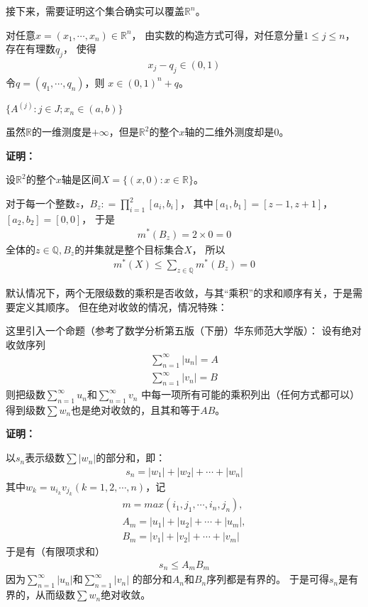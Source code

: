 \documentclass{article}
\begin{document}
接下来，需要证明这个集合确实可以覆盖$\mathbb{R}^n$。

对任意$x = (x_1, \cdots, x_n) \in \mathbb{R}^n$，
由实数的构造方式可得，对任意分量$1 \leq j \leq n$，
存在有理数$q_j$，
使得
\begin{align*}
  x_j - q_j \in (0, 1)
\end{align*}
令$q = (q_1, \cdots, q_n)$，则
$x \in (0, 1)^n + q$。

$\{A^{(j)}: j \in J; x_n \in (a, b)\}$

\begin{zremark}
  虽然$\mathbb{R}$的一维测度是$+\infty$，但是$\mathbb{R}^2$的整个$x$轴的二维外测度却是$0$。
\end{zremark}

\textbf{证明：}

设$\mathbb{R}^2$的整个$x$轴是区间$X = \{(x, 0): x \in \mathbb{R}\}$。

对于每一个整数$z$，$B_z : = \prod \limits_{i = 1}^2 [a_i, b_i]$，
其中$[a_1, b_1]= [z - 1, z + 1]$，$[a_2, b_2] = [0, 0]$，
于是
\begin{align*}
  m^{\ast}(B_z) = 2 \times 0 = 0
\end{align*}
全体的$z \in \mathbb{Q}, B_z$的并集就是整个目标集合$X$，
所以
\begin{align*}
  m^{\ast}(X) \leq \sum \limits_{z \in \mathbb{Q}} m^{\ast}(B_z) = 0
\end{align*}

\begin{zremark}
  默认情况下，两个无限级数的乘积是否收敛，与其“乘积”的求和顺序有关，于是需要定义其顺序。
  但在绝对收敛的情况，情况特殊：

  这里引入一个命题（参考了数学分析第五版（下册）华东师范大学版）：
  设有绝对收敛序列
  \begin{align*}
    \sum \limits_{n = 1}^{\infty} |u_n| = A \\
    \sum \limits_{n = 1}^{\infty} |v_n| = B
  \end{align*}
  则把级数$\sum \limits_{n = 1}^{\infty} u_n$和$\sum \limits_{n = 1}^{\infty} v_n$
  中每一项所有可能的乘积列出（任何方式都可以）得到级数$\sum w_n$也是绝对收敛的，且其和等于$AB$。
\end{zremark}

\textbf{证明：}

以$s_n$表示级数$\sum |w_n|$的部分和，即：
\begin{align*}
  s_n = |w_1| + |w_2| + \cdots + |w_n|
\end{align*}
其中$w_k = u_{i_k}v_{j_k}(k = 1, 2, \cdots, n)$，记
\begin{align*}
  m = max(i_1, j_1, \cdots, i_n, j_n),  \\
  A_m = |u_1| + |u_2| + \cdots + |u_m|, \\
  B_m = |v_1| + |v_2| + \cdots + |v_m|
\end{align*}
于是有（有限项求和）
\begin{align*}
  s_n \leq A_m B_m
\end{align*}
因为$\sum \limits_{n = 1}^{\infty} |u_n|$和$\sum \limits_{n = 1}^{\infty} |v_n|$
的部分和${A_n}$和${B_n}$序列都是有界的。
于是可得${s_n}$是有界的，从而级数$\sum w_n$绝对收敛。
\end{document}
